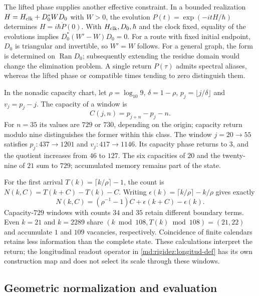 The lifted phase supplies another effective constraint. In a bounded
realization $H=H_{\rm clk}+D_0^*WD_0$ with $W>0$, the evolution
$P(t)=\exp(-itH/\hbar)$ determines $H=i\hbar\dot P(0)$.
With $H_{\rm clk},D_0,\hbar$ and the clock fixed, equality of the
evolutions implies $D_0^*(W'-W)D_0=0$. For a route with fixed
initial endpoint, $D_0$ is triangular and invertible, so $W'=W$ follows.
For a general graph, the form is determined on $\operatorname{Ran}D_0$;
subsequently extending the residue domain would change the elimination
problem. A single return $P(\tau)$ admits spectral aliases, whereas
the lifted phase or compatible times tending to zero distinguish them.

In the nonadic capacity chart, let
$\rho=\log_{10}9$, $\delta=1-\rho$,
$p_j=\lfloor j/\delta\rfloor$ and $v_j=p_j-j$. The capacity of a window is
\[
 C(j,n)=p_{j+n}-p_j-n.
\]
For $n=35$ its values are $729$ or $730$, depending on the origin;
capacity return modulo nine distinguishes the former within this class.
The window $j=20\to55$ satisfies $p_j:437\to1201$ and
$v_j:417\to1146$. Its capacity phase returns to $3$, and the quotient
increases from $46$ to $127$. The six capacities of $20$ and the
twenty-nine of $21$ sum to $729$; accumulated memory remains part
of the state.

For the first arrival $T(k)=\lceil k/\rho\rceil-1$, the count is
$N(k,C)=T(k+C)-T(k)-C$. Writing
$\epsilon(k)=\lceil k/\rho\rceil-k/\rho$ gives exactly
\[
 N(k,C)=(\rho^{-1}-1)C+\epsilon(k+C)-\epsilon(k).
\]
Capacity-$729$ windows with counts $34$ and $35$ retain different
boundary terms. Even $k=21$ and $k=2289$ share
$(k\bmod108,T(k)\bmod108)=(21,22)$ and accumulate $1$ and
$109$ vacancies, respectively. Coincidence of finite calendars retains
less information than the complete state. These calculations interpret
the return; the longitudinal readout operator in
\eqref{md:rigidez:longitud-def} has its own construction map and does
not select its scale through these windows.

\subsection{Geometric normalization and evaluation}
\label{md:rigidez:evaluacion}

